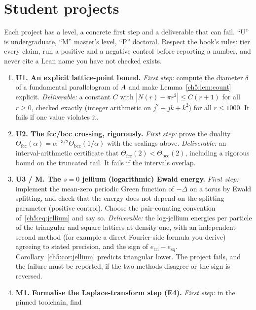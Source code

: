 \section{Student projects}
\label{ch5:sec:projects}

Each project has a level, a concrete first step and a deliverable that can fail. ``U'' is undergraduate, ``M''
master's level, ``P'' doctoral. Respect the book's rules: tier every claim, run a positive and a negative control
before reporting a number, and never cite a Lean name you have not checked exists.

\begin{enumerate}[leftmargin=*,label=\textbf{\arabic*.}]
\item \textbf{U1. An explicit lattice-point bound.} \emph{First step:} compute the diameter $\delta$ of a fundamental
  parallelogram of $A$ and make Lemma~\ref{ch5:lem:count} explicit. \emph{Deliverable:} a constant $C$ with
  $|N(r)-\pi r^2|\le C(r+1)$ for all $r\ge0$, checked exactly (integer arithmetic on $j^2+jk+k^2$) for all $r\le1000$.
  It fails if one value violates it.
\item \textbf{U2. The fcc/bcc crossing, rigorously.} \emph{First step:} prove the duality $\Theta_{\mathrm{fcc}}(\alpha)=
  \alpha^{-3/2}\Theta_{\mathrm{bcc}}(1/\alpha)$ with the scalings above. \emph{Deliverable:} an interval-arithmetic
  certificate that $\Theta_{\mathrm{fcc}}(2)<\Theta_{\mathrm{bcc}}(2)$, including a rigorous bound on the truncated
  tail. It fails if the intervals overlap.
\item \textbf{U3 / M. The $s=0$ jellium (logarithmic) Ewald energy.} \emph{First step:} implement the mean-zero
  periodic Green function of $-\Delta$ on a torus by Ewald splitting, and check that the energy does not depend on
  the splitting parameter (positive control). Choose the pair-counting convention of~\eqref{ch5:eq:jellium} and say so.
  \emph{Deliverable:} the log-jellium energies per particle of the triangular and square lattices at density one,
  with an independent second method (for example a direct Fourier-side formula you derive) agreeing to stated
  precision, and the sign of $e_{\mathrm{tri}}-e_{\mathrm{sq}}$. Corollary~\ref{ch5:cor:jellium} predicts triangular
  lower. The project fails, and the failure must be reported, if the two methods disagree or the sign is reversed.
\item \textbf{M1. Formalise the Laplace-transform step (E4).} \emph{First step:} in the pinned toolchain, find

\end{enumerate}
